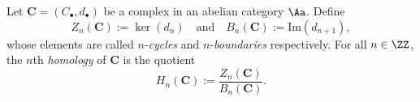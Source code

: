 \begin{defin}
  Let $\mathbf{C}=(C_{\bullet},d_{\bullet})$ be a complex in an abelian category $\Aa$. Define
  \[
    Z_n(\mathbf{C}):=\ker(d_n) \quad\text{and}\quad B_n(\mathbf{C}):=\text{Im}(d_{n+1}),
  \]
  whose elements are called $n$-\emph{cycles} and $n$-\emph{boundaries} respectively.
  For all $n\in\ZZ$, the $n$th \emph{homology} of $\mathbf{C}$ is the quotient
  \[
    H_n(\mathbf{C}):=\frac{Z_n(\mathbf{C})}{B_n(\mathbf{C})}.
  \]
\end{defin}